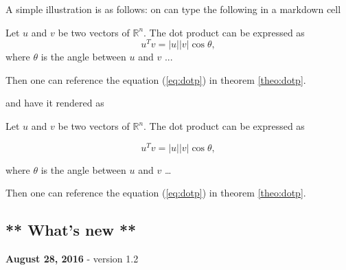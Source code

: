 A simple illustration is as follows: on can type the following in a
markdown cell

\begin{listing}
\begin{theorem} \label{theo:dotp}
Let $u$ and $v$ be two vectors of $\mathbb{R}^n$. The dot product can be expressed as
\begin{equation}
\label{eq:dotp}
u^Tv = |u||v| \cos \theta,
\end{equation}
where $\theta$ is the angle between $u$ and $v$ ...
\end{theorem}
Then one can reference the equation (\ref{eq:dotp}) in theorem \ref{theo:dotp}.
\end{listing}

and have it rendered as

\begin{theorem} \label{theo:dotp} Let \(u\) and \(v\) be two
vectors of \(\mathbb{R}^n\). The dot product can be expressed as

\begin{equation}
\label{eq:dotp}
u^Tv = |u||v| \cos \theta,
\end{equation}

where \(\theta\) is the angle between \(u\) and \(v\) \ldots{}
\end{theorem} Then one can reference the equation
(\ref{eq:dotp}) in theorem \ref{theo:dotp}.

    \subsection{** What's new **}\label{whats-new}

\textbf{August 28, 2016} - version 1.2

